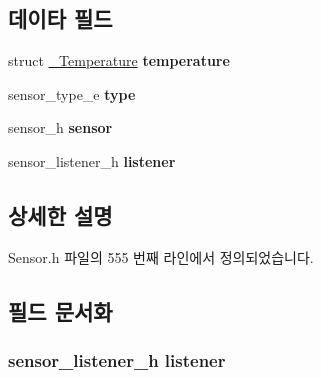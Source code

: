 \subsection*{데이타 필드}
\begin{DoxyCompactItemize}
\item 
\hypertarget{struct___temperature_extend_ae174a42339036c716d64258eab61d521}{struct \hyperlink{struct___temperature}{\-\_\-\-Temperature} {\bfseries temperature}}\label{struct___temperature_extend_ae174a42339036c716d64258eab61d521}

\item 
\hypertarget{struct___temperature_extend_abffb09766da2fc510a79bb51f82a36e1}{sensor\-\_\-type\-\_\-e {\bfseries type}}\label{struct___temperature_extend_abffb09766da2fc510a79bb51f82a36e1}

\item 
\hypertarget{struct___temperature_extend_a5bae9b7801bc3808411925cde81d3f26}{sensor\-\_\-h {\bfseries sensor}}\label{struct___temperature_extend_a5bae9b7801bc3808411925cde81d3f26}

\item 
\hypertarget{struct___temperature_extend_aa977dfb866b24fd7d9a20a9a01b2fd1f}{sensor\-\_\-listener\-\_\-h {\bfseries listener}}\label{struct___temperature_extend_aa977dfb866b24fd7d9a20a9a01b2fd1f}

\end{DoxyCompactItemize}


\subsection{상세한 설명}


Sensor.\-h 파일의 555 번째 라인에서 정의되었습니다.



\subsection{필드 문서화}
\hypertarget{struct___temperature_extend_aa977dfb866b24fd7d9a20a9a01b2fd1f}{
\subsubsection[{listener}]{\setlength{\rightskip}{0pt plus 5cm}sensor\-\_\-listener\-\_\-h listener}}\label{struct___temperature_extend_aa977dfb866b24fd7d9a20a9a01b2fd1f}


